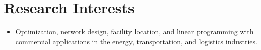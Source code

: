 \documentclass[10pt, letterpaper]{article}
\begin{document}
%	
%	

\section*{Research Interests} %
 	\vspace{5pt}
\begin{itemize}
	\item Optimization, network design, facility location, and linear programming with commercial applications in the energy, transportation, and logistics industries.
\end{itemize}
\end{document}
